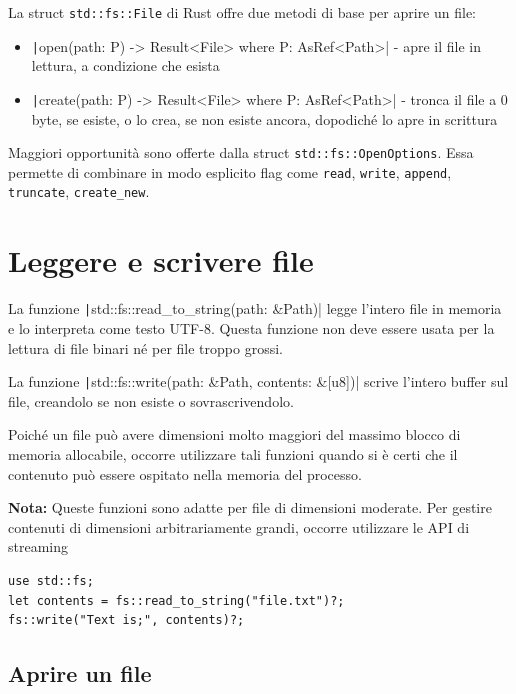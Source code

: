 La struct \texttt{std::fs::File} di Rust offre due metodi di base per aprire un file:

\begin{itemize}
  \item[] \texttt|open(path: P) -> Result<File> where P: AsRef<Path>| -
        apre il file in lettura, a condizione che esista
  \item[] \texttt|create(path: P) -> Result<File> where P: AsRef<Path>| -
        tronca il file a 0 byte, se esiste, o lo crea, se non esiste ancora, dopodiché
        lo apre in scrittura
\end{itemize}


Maggiori opportunità sono offerte dalla struct \texttt{std::fs::OpenOptions}.
Essa permette di combinare in modo esplicito flag come \verb|read|, \verb|write|,
\verb|append|, \verb|truncate|, \verb|create_new|.


\section{Leggere e scrivere file}
La funzione \texttt|std::fs::read_to_string(path: &Path)|
legge l'intero file in memoria e lo interpreta come testo UTF-8. Questa funzione
non deve essere usata per la lettura di file binari né per file troppo grossi.

La funzione \texttt|std::fs::write(path: &Path, contents: &[u8])|
scrive l'intero buffer sul file, creandolo se non esiste o sovrascrivendolo.

Poiché un file può avere dimensioni molto maggiori del massimo blocco di
memoria allocabile, occorre utilizzare tali funzioni quando si è certi che il
contenuto può essere ospitato nella memoria del processo.

\begin{tcolorbox}
  \textbf{Nota:} Queste funzioni sono adatte per file di dimensioni moderate.
  Per gestire contenuti di dimensioni arbitrariamente grandi, occorre utilizzare
  le API di streaming
\end{tcolorbox}

\begin{verbatim}
use std::fs;
let contents = fs::read_to_string("file.txt")?;
fs::write("Text is;", contents)?;
\end{verbatim}


\subsection{Aprire un file}

